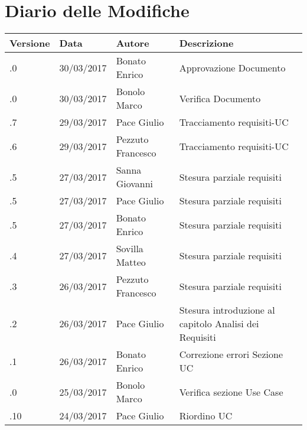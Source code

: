 \section*{Diario delle Modifiche}
\begin{longtabu} to \textwidth {
	X[4,l,p]
	X[4,l,p]
	X[4,l,p]
	X[8,l,p]}
	\toprule
		 Versione & Data & Autore & Descrizione \\
		\midrule
		\endhead
		
		\addlinespace[0.2em]
		\midrule
		.0 & 30/03/2017 & Bonato Enrico & Approvazione Documento\\
		\addlinespace[0.2em]
		\midrule
		.0 & 30/03/2017 & Bonolo Marco & Verifica Documento\\
		\addlinespace[0.2em]
		\midrule
		.7 & 29/03/2017 & Pace Giulio & Tracciamento requisiti-UC\\
		\addlinespace[0.2em]
		\midrule
		.6 & 29/03/2017 & Pezzuto Francesco & Tracciamento requisiti-UC\\
		\addlinespace[0.2em]
		\midrule
		.5 & 27/03/2017 & Sanna Giovanni & Stesura parziale requisiti\\
		\addlinespace[0.2em]
		\midrule
		.5 & 27/03/2017 & Pace Giulio & Stesura parziale requisiti\\
		\addlinespace[0.2em]
		\midrule
		.5 & 27/03/2017 & Bonato Enrico & Stesura parziale requisiti\\
		\addlinespace[0.2em]
		\midrule
		.4 & 27/03/2017 & Sovilla Matteo & Stesura parziale requisiti\\
		\addlinespace[0.2em]
		\midrule
		.3 & 26/03/2017 & Pezzuto Francesco & Stesura parziale requisiti\\
		\addlinespace[0.2em]
		\midrule
		.2 & 26/03/2017 & Pace Giulio & Stesura introduzione al capitolo Analisi dei Requisiti\\
		\addlinespace[0.2em]
		\midrule
		.1 & 26/03/2017 & Bonato Enrico & Correzione errori Sezione UC\\
		\addlinespace[0.2em]
		\midrule
		.0 & 25/03/2017 & Bonolo Marco & Verifica sezione Use Case\\
		\addlinespace[0.2em]
		\midrule
		.10 & 24/03/2017 & Pace Giulio & Riordino UC\\

\end{longtabu}
